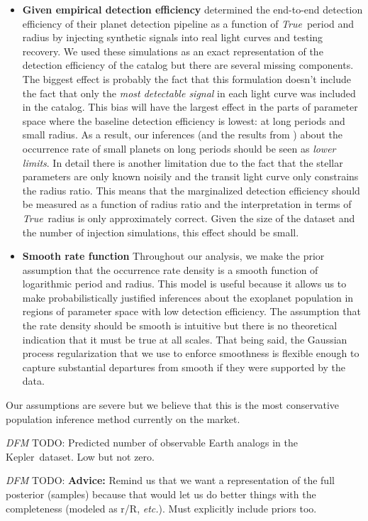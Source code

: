 \documentclass[12pt,preprint]{aastex}
\newcommand{\project}[1]{{\sffamily #1}}
\newcommand{\kepler}{\project{Kepler}}
\newcommand{\foreign}[1]{\emph{#1}}
\newcommand{\etc}{\foreign{etc.}}
\newcommand{\True}{\foreign{True}}
\newcommand{\todo}[3]{{\color{#2} \emph{#1} TODO: #3}}
\newcommand{\dfmtodo}[1]{\todo{DFM}{red}{#1}}
\begin{document}
\begin{itemize}
\item {\bf Given empirical detection efficiency}\quad
\citet{petigura} determined the end-to-end detection efficiency of their
planet detection pipeline as a function of \True\ period and radius by
injecting synthetic signals into real light curves and testing recovery.
We used these simulations as an exact representation of the detection
efficiency of the catalog but there are several missing components.
The biggest effect is probably the fact that this formulation doesn't include
the fact that only the \emph{most detectable signal} in each light curve was
included in the catalog.
This bias will have the largest effect in the parts of parameter space where
the baseline detection efficiency is lowest: at long periods and small radius.
As a result, our inferences (and the results from \citealt{petigura}) about
the occurrence rate of small planets on long periods should be seen as
\emph{lower limits}.
In detail there is another limitation due to the fact that the stellar
parameters are only known noisily and the transit light curve only constrains
the radius ratio.
This means that the marginalized detection efficiency should be measured as a
function of radius ratio and the interpretation in terms of \True\ radius is
only approximately correct.
Given the size of the dataset and the number of injection simulations, this
effect should be small.

\item {\bf Smooth rate function}\quad
Throughout our analysis, we make the prior assumption that the occurrence rate
density is a smooth function of logarithmic period and radius.
This model is useful because it allows us to make probabilistically justified
inferences about the exoplanet population in regions of parameter space with
low detection efficiency.
The assumption that the rate density should be smooth is intuitive but there
is no theoretical indication that it must be true at all scales.
That being said, the Gaussian process regularization that we use to enforce
smoothness is flexible enough to capture substantial departures from smooth if
they were supported by the data.

\end{itemize}
Our assumptions are severe but we believe that this is the most conservative
population inference method currently on the market.

\dfmtodo{%
Predicted number of observable Earth analogs in the \kepler\ dataset.
Low but not zero.
}

\dfmtodo{%
{\bf Advice:} \quad
Remind us that we want a representation of the full posterior (samples)
because that would let us do better things with the completeness (modeled as
r/R, \etc).
Must explicitly include priors too.
}
\end{document}
